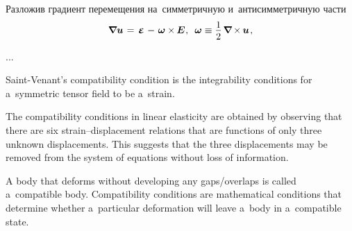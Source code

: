 \begin{otherlanguage}{russian}

Разложив градиент перемещения на~симметричную и~антисимметричную части
\nopagebreak\vspace{.1em}\begin{equation}
\boldnabla \bm{u} \hspace{.2ex} = \tikzmark{beginSymmNablaU} \hspace{.32ex} \infinitesimaldeformation \hspace{.4ex} \tikzmark{endSymmNablaU} \hspace{-0.16ex} - \hspace{.25ex} \tikzmark{beginAsymmNablaU} \bm{\omega} \times \hspace{-0.12ex} \UnitDyad \tikzmark{endAsymmNablaU} \hspace{.1ex} , \:\;
\bm{\omega} \equiv \displaystyle \onehalf \hspace{.32ex} \boldnabla \hspace{-0.12ex} \times \hspace{-0.12ex} \bm{u} \hspace{.2ex},
\end{equation}%
%

...

{\small
Saint\hbox{-\hspace{-0.2ex}}Venant’s compatibility condition is the integrability conditions for a~symmetric tensor field to be a~strain.

The compatibility conditions in linear elasticity are obtained by observing that there are six strain\hbox{--}displacement relations that are functions of only three unknown displacements. This suggests that the three displacements may be removed from the system of equations without loss of information.

A body that deforms without developing any gaps/overlaps is called a~compatible body. Compatibility conditions are mathematical conditions that determine whether a~particular deformation will leave a~body in a~compatible state.
\par}


\end{otherlanguage}
